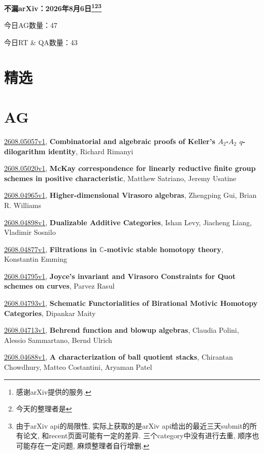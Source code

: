 \documentclass[9pt, a4paper]{article}
\theoremstyle{plain}
\theoremstyle{definition}
\theoremstyle{remark}
\newcommand{\arxiv}[3]{\href{https://arxiv.org/abs/#1}{#1}, \textbf{\textcolor{arxivblue}{#2}}, #3}
\newcommand{\AGnumber}{47}
\newcommand{\RTQAnumber}{43}
\newcommand{\NewestDate}{2026年8月6日}
\newcommand{\todayarXiver}{} %
\begin{document}
\begin{center}
    \Huge\textbf{不漏arXiv：\NewestDate\footnote{感谢arXiv提供的服务.}\footnote{今天的整理者是\todayarXiver}\footnote{由于arXiv api的局限性, 实际上获取的是arXiv api给出的最近三天submit的所有论文, 和recent页面可能有一定的差异. 三个category中没有进行去重, 顺序也可能存在一定问题, 麻烦整理者自行增删.}} \\
\end{center}

\setcounter{section}{-1}

\begin{center}
    今日AG数量：\AGnumber
    
    今日RT \& QA数量：\RTQAnumber
    
\end{center}


\section{精选}


\section{AG}
\arxiv{2608.05057v1}{Combinatorial and algebraic proofs of Keller's $A_2\square A_2$ $q$-dilogarithm identity}{Richard Rimanyi}

\arxiv{2608.05020v1}{McKay correspondence for linearly reductive finite group schemes in positive characteristic}{Matthew Satriano, Jeremy Usatine}

\arxiv{2608.04965v1}{Higher-dimensional Virasoro algebras}{Zhengping Gui, Brian R. Williams}

\arxiv{2608.04898v1}{Dualizable Additive Categories}{Ishan Levy, Jiacheng Liang, Vladimir Sosnilo}

\arxiv{2608.04877v1}{Filtrations in $\mathbb{C}$-motivic stable homotopy theory}{Konstantin Emming}

\arxiv{2608.04795v1}{Joyce's invariant and Virasoro Constraints for Quot schemes on curves}{Parvez Rasul}

\arxiv{2608.04793v1}{Schematic Functorialities of Birational Motivic Homotopy Categories}{Dipankar Maity}

\arxiv{2608.04713v1}{Behrend function and blowup algebras}{Claudia Polini, Alessio Sammartano, Bernd Ulrich}

\arxiv{2608.04688v1}{A characterization of ball quotient stacks}{Chirantan Chowdhury, Matteo Costantini, Aryaman Patel}
\end{document}
